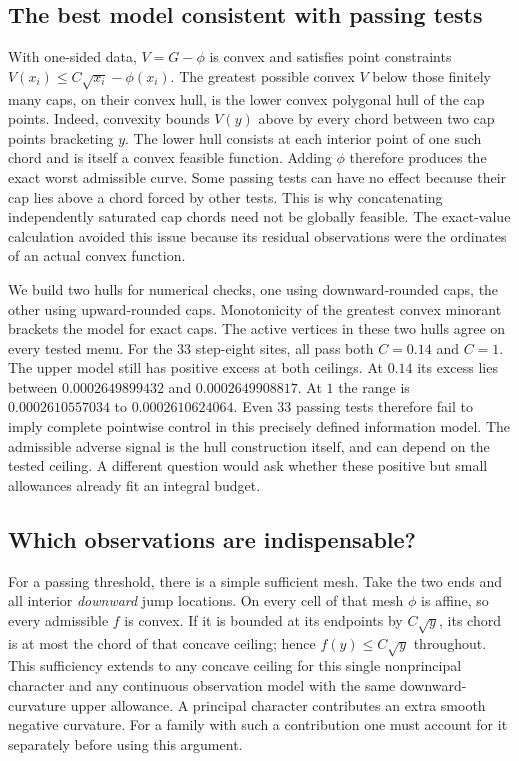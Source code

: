 \documentclass[12pt,letterpaper]{article}
\begin{document}
\subsection{The best model consistent with passing tests}
With one-sided data, \(V=G-\phi\) is convex and satisfies point constraints \(V(x_i)\le C\sqrt{x_i}-\phi(x_i)\). The greatest possible convex \(V\) below those finitely many caps, on their convex hull, is the lower convex polygonal hull of the cap points. Indeed, convexity bounds \(V(y)\) above by every chord between two cap points bracketing \(y\). The lower hull consists at each interior point of one such chord and is itself a convex feasible function. Adding \(\phi\) therefore produces the exact worst admissible curve. Some passing tests can have no effect because their cap lies above a chord forced by other tests. This is why concatenating independently saturated cap chords need not be globally feasible. The exact-value calculation avoided this issue because its residual observations were the ordinates of an actual convex function.

We build two hulls for numerical checks, one using downward-rounded caps, the other using upward-rounded caps. Monotonicity of the greatest convex minorant brackets the model for exact caps. The active vertices in these two hulls agree on every tested menu. For the 33 step-eight sites, all pass both \(C=0.14\) and \(C=1\). The upper model still has positive excess at both ceilings. At \(0.14\) its excess lies between \(0.0002649899432\) and \(0.0002649908817\). At \(1\) the range is \(0.0002610557034\) to \(0.0002610624064\). Even 33 passing tests therefore fail to imply complete pointwise control in this precisely defined information model. The admissible adverse signal is the hull construction itself, and can depend on the tested ceiling. A different question would ask whether these positive but small allowances already fit an integral budget.

\subsection{Which observations are indispensable?}
For a passing threshold, there is a simple sufficient mesh. Take the two ends and all interior \emph{downward} jump locations. On every cell of that mesh \(\phi\) is affine, so every admissible \(f\) is convex. If it is bounded at its endpoints by \(C\sqrt y\), its chord is at most the chord of that concave ceiling; hence \(f(y)\le C\sqrt y\) throughout. This sufficiency extends to any concave ceiling for this single nonprincipal character and any continuous observation model with the same downward-curvature upper allowance. A principal character contributes an extra smooth negative curvature. For a family with such a contribution one must account for it separately before using this argument.
\end{document}
